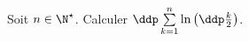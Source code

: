 
\begin{exercice} \; 
Soit $n\in\N^{\star}$. Calculer $\ddp \sum\limits_{k=1}^n \ln{\left( \ddp\frac{k}{2}  \right)}$.
\end{exercice}